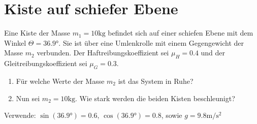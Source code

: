 \section{Kiste auf schiefer Ebene}
Eine Kiste der Masse $m_1 = 10 \si{\kilo\gram}$ befindet sich auf einer schiefen Ebene mit dem Winkel $\Theta = 36.9\si{\degree}$.
Sie ist über eine Umlenkrolle mit einem Gegengewicht der Masse $m_2$ verbunden. Der Haftreibungskoeffizient sei $\mu_H = 0.4$ und
der Gleitreibungskoeffizient sei $\mu_G = 0.3$.
  \begin{enumerate}[label=\roman*]
    \item Für welche Werte der Masse $m_2$ ist das System in Ruhe?
    \item Nun sei $m_2 = 10\si{\kilo\gram}$. Wie stark werden die beiden Kisten beschleunigt?
  \end{enumerate}
Verwende: $\sin\left(36.9\si{\degree}\right) = 0.6,\, \cos\left(36.9\si{\degree}\right) = 0.8$, sowie $g = 9.8 \si{\meter \per \second^2}$

\newpage
